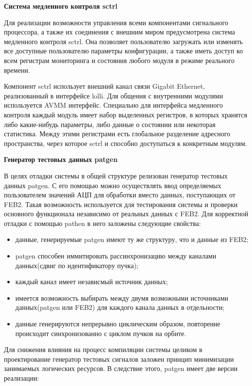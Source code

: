 \textbf{Система медленного контроля sctrl}\par
Для реализации возможности управления всеми компонентами сигнального процессора, а также их соединения с внешним миром предусмотрена система медленного контроля sctrl. Она позволяет пользователю загружать или изменять все доступные пользователю параметры конфигурации, а также иметь доступ ко всем регистрам мониторинга и состояния любого модуля в режиме реального времени.\par
Компонент sctrl использует внешний канал связи Gigabit Ethernet, реализованный в интерфейсе lolli. Для общения с внутренними модулями используется AVMM интерфейс. Специально для интерфейса медленного контроля каждый модуль имеет набор выделенных регистров, в которых хранятся либо какие-нибудь параметры, либо данные о состоянии или некоторая статистика. Между этими регистрами есть глобальное разделение адресного пространства, через которое sctrl и способно доступаться к конкретным модулям.\par
\textbf{Генератор тестовых данных patgen}\par
В целях отладки системы в общей структуре релизован генератор тестовых данных patgen. С его помощью можно осуществлять ввод определяемых пользователем значений АЦП для обработки вместо данных, поступающих от FEB2. Такая возможность используется для тестирования системы и проверки основного функционала независимо от реальных данных с FEB2. Для корректной отладки с помощью pathen в него заложены следующие свойства:\par
\begin{itemize}
    \item данные, генерируемые patgen имеют ту же структуру, что и данные из FEB2;
    \item patgen способен иммитировать рассинхронизацию между каналами данных(сдвиг по идентификатору пучка);
    \item каждый канал имеет независмый источник данных;
    \item имеется возможность выбирать между двумя возможными источниками данных(patgen или FEB2) для каждого канала данных в отдельности;
    \item данные генерируются непрерывно циклическим образом, повторение происходит синхронизованно с циклом пучков на орбите.
\end{itemize}\par
Для снижения влияния на процесс компиляции системы целиком в проектирование генератор тестовых сигналов заложен принцип минимизации занимаемых логических ресурсов. В следствие этого, patgen имеет две версии реализации:\par
